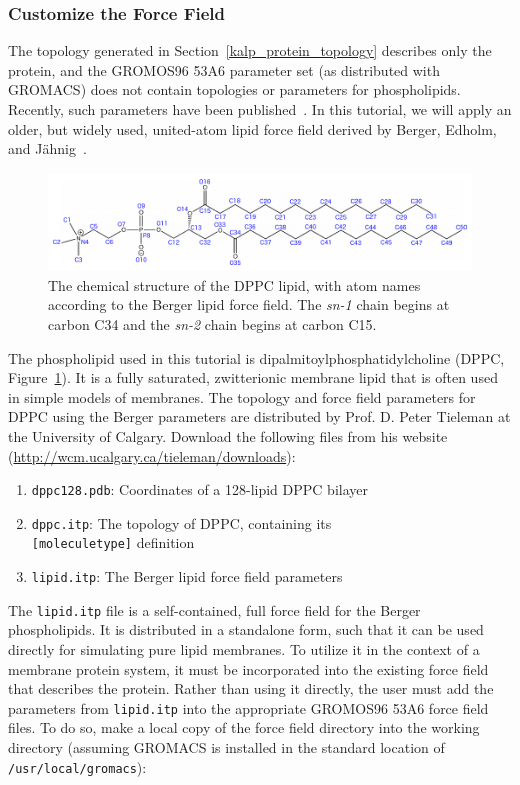 \documentclass[9pt,tutorial]{livecoms}
\begin{document}
\subsubsection{Customize the Force Field} \label{kalp_ff}

The topology generated in Section~\ref{kalp_protein_topology} describes only the protein, and the GROMOS96 53A6 parameter set (as distributed with GROMACS) does not contain topologies or parameters for phospholipids. Recently, such parameters have been published~\cite{Kukol2009}. In this tutorial, we will apply an older, but widely used, united-atom lipid force field derived by Berger, Edholm, and J{\"a}hnig~\cite{Berger1997}.

\begin{figure}[h!]
\centering
\includegraphics{DPPC}
\caption{The chemical structure of the DPPC lipid, with atom names according to the Berger lipid force field. The {\em sn-1} chain begins at carbon C34 and the {\em sn-2} chain begins at carbon C15.}
\label{kalp_dppc_structure_fig}
\end{figure}

The phospholipid used in this tutorial is dipalmitoylphosphatidylcholine (DPPC, Figure~\ref{kalp_dppc_structure_fig}). It is a fully saturated, zwitterionic membrane lipid that is often used in simple models of membranes. The topology and force field parameters for DPPC using the Berger parameters are distributed by Prof. D. Peter Tieleman at the University of Calgary. Download the following files from his website (\url{http://wcm.ucalgary.ca/tieleman/downloads}):

\begin{enumerate}
	\item{\texttt{dppc128.pdb}: Coordinates of a 128-lipid DPPC bilayer}
	\item{\texttt{dppc.itp}: The topology of DPPC, containing its\\ \texttt{[moleculetype]} definition}
	\item{\texttt{lipid.itp}: The Berger lipid force field parameters}
\end{enumerate}

The \texttt{lipid.itp} file is a self-contained, full force field for the Berger phospholipids. It is distributed in a standalone form, such that it can be used directly for simulating pure lipid membranes. To utilize it in the context of a membrane protein system, it must be incorporated into the existing force field that describes the protein. Rather than using it directly, the user must add the parameters from \texttt{lipid.itp} into the appropriate GROMOS96 53A6 force field files. To do so, make a local copy of the force field directory into the working directory (assuming GROMACS is installed in the standard location of \texttt{/usr/local/gromacs}):
\end{document}

